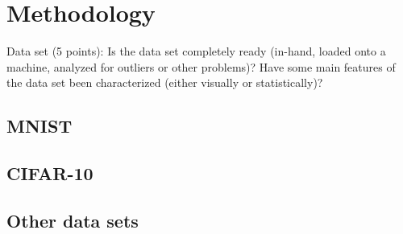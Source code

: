 \section{Methodology}
\label{sec:meth}

Data set (5 points): Is the data set completely ready (in-hand, loaded onto a
machine, analyzed for outliers or other problems)? Have some main features of
the data set been characterized (either visually or statistically)?

\subsection{MNIST}

\subsection{CIFAR-10}

\subsection{Other data sets}


